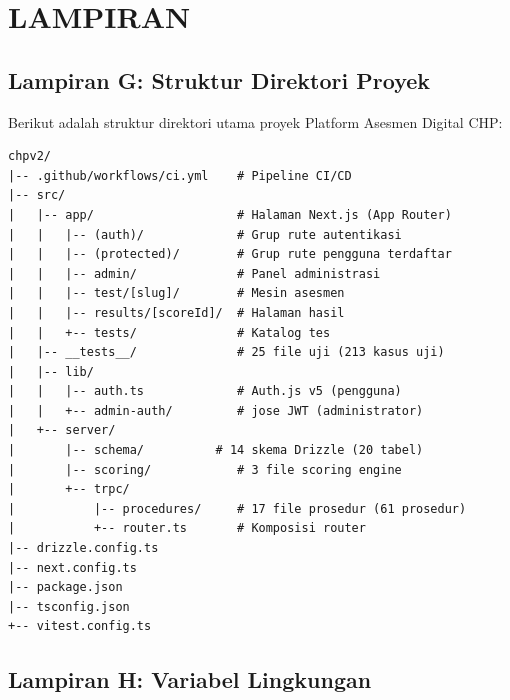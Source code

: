\clearpage
\setcounter{page}{1}
\renewcommand{\thepage}{L-\arabic{page}}
{}

\chapter*{LAMPIRAN}
\label{chap:lampiran}




\section*{Lampiran G: Struktur Direktori Proyek}

Berikut adalah struktur direktori utama proyek Platform Asesmen Digital CHP:

\begin{verbatim}
chpv2/
|-- .github/workflows/ci.yml    # Pipeline CI/CD
|-- src/
|   |-- app/                    # Halaman Next.js (App Router)
|   |   |-- (auth)/             # Grup rute autentikasi
|   |   |-- (protected)/        # Grup rute pengguna terdaftar
|   |   |-- admin/              # Panel administrasi
|   |   |-- test/[slug]/        # Mesin asesmen
|   |   |-- results/[scoreId]/  # Halaman hasil
|   |   +-- tests/              # Katalog tes
|   |-- __tests__/              # 25 file uji (213 kasus uji)
|   |-- lib/
|   |   |-- auth.ts             # Auth.js v5 (pengguna)
|   |   +-- admin-auth/         # jose JWT (administrator)
|   +-- server/
|       |-- schema/          # 14 skema Drizzle (20 tabel)
|       |-- scoring/            # 3 file scoring engine
|       +-- trpc/
|           |-- procedures/     # 17 file prosedur (61 prosedur)
|           +-- router.ts       # Komposisi router
|-- drizzle.config.ts
|-- next.config.ts
|-- package.json
|-- tsconfig.json
+-- vitest.config.ts
\end{verbatim}

\section*{Lampiran H: Variabel Lingkungan}

